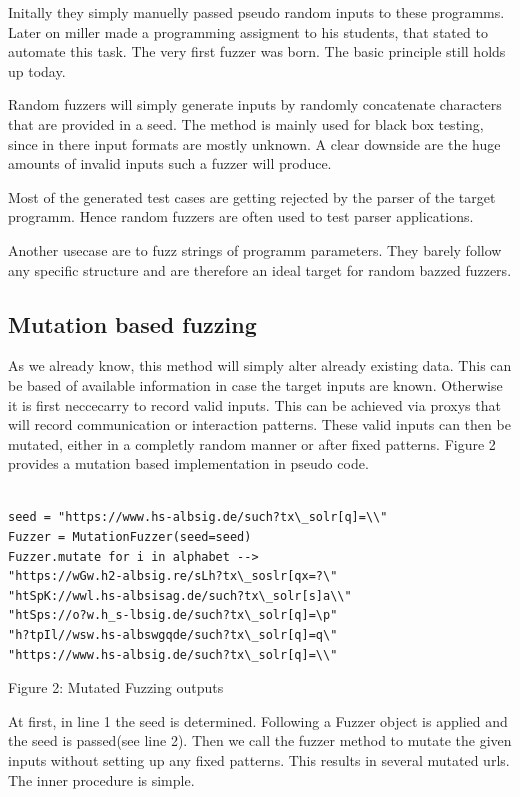 \documentclass[journal=tosc,final]{iacrtrans}
\begin{document}
Initally they simply manuelly passed pseudo random inputs to these programms. Later on miller made a programming assigment to his students, that stated to automate this task. The very first fuzzer was born. The basic principle still holds up today. 

Random fuzzers will simply generate inputs by randomly concatenate characters that are provided in a seed. The method is mainly used for black box testing, since in there input formats are mostly unknown. A clear downside are the huge amounts of invalid inputs such a fuzzer will produce. 

Most of the generated test cases are getting rejected by the parser of the target programm. Hence random fuzzers are often used to test parser applications.

Another usecase are to fuzz strings of programm parameters. They barely follow any specific structure and are therefore an ideal target for random bazzed fuzzers. 
\subsection{Mutation based fuzzing}
As we already know, this method will simply alter already existing data. This can be based of available information in case the target inputs are known. Otherwise it is first neccecarry to record valid inputs. This can be achieved via proxys that will record communication or interaction patterns. These valid inputs can then be mutated, either in a completly random manner or after fixed patterns. Figure 2 provides a mutation based implementation in pseudo code. 

\begin{center}
\begin{shaded}
\begin{internallinenumbers}
\begin{verbatim}

seed = "https://www.hs-albsig.de/such?tx\_solr[q]=\\"
Fuzzer = MutationFuzzer(seed=seed)
Fuzzer.mutate for i in alphabet -->
"https://wGw.h2-albsig.re/sLh?tx\_soslr[qx=?\"
"htSpK://wwl.hs-albsisag.de/such?tx\_solr[s]a\\"
"htSps://o?w.h_s-lbsig.de/such?tx\_solr[q]=\p"
"h?tpIl//wsw.hs-albswgqde/such?tx\_solr[q]=q\"
"https://www.hs-albsig.de/such?tx\_solr[q]=\\"
\end{verbatim}
\end{internallinenumbers}
\vspace{2mm} Figure 2: Mutated Fuzzing outputs
\end{shaded}
\end{center}
At first, in line 1 the seed is determined. Following a Fuzzer object is applied and the seed is passed(see line 2). Then we call the fuzzer method to mutate the given inputs without setting up any fixed patterns. This results in several mutated urls. The inner procedure is simple.
\end{document}
